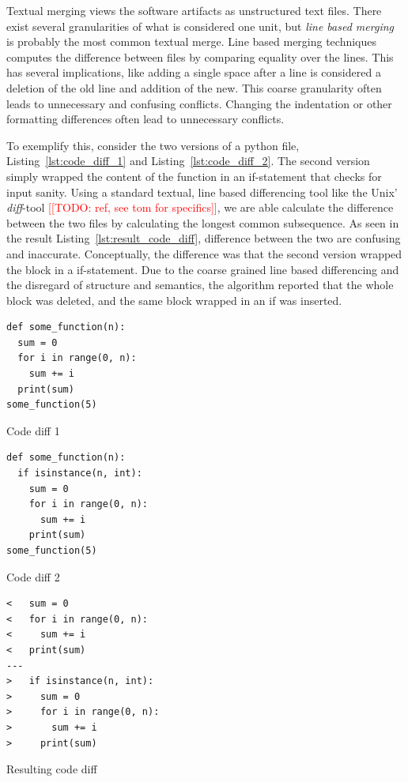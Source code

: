 \documentclass[a4paper,english]{ifimaster}
\newcommand{\todo}[1]{\textcolor{red}{[[TODO: #1]]}\PackageWarning{TODO:}{#1!}}
\begin{document}
Textual merging views the software artifacts as unstructured text files. There exist several granularities of what is considered one unit, but \textit{line based merging} is probably the most common textual merge. Line based merging techniques computes the difference between files by comparing equality over the lines. This has several implications, like adding a single space after a line is considered a deletion of the old line and addition of the new. This coarse granularity often leads to unnecessary and confusing conflicts. Changing the indentation or other formatting differences often lead to unnecessary conflicts.

To exemplify this, consider the two versions of a python file, Listing~\ref{lst:code_diff_1} and Listing~\ref{lst:code_diff_2}. The second version simply wrapped the content of the function in an if-statement that checks for input sanity. Using a standard textual, line based differencing tool like the Unix' \textit{diff}-tool \todo{ref, see tom for specifics}, we are able calculate the difference between the two files by calculating the longest common subsequence. As seen in the result Listing~\ref{lst:result_code_diff}, difference between the two are confusing and inaccurate. Conceptually, the difference was that the second version wrapped the block in a if-statement. Due to the coarse grained line based differencing and the disregard of structure and semantics, the algorithm reported that the whole block was deleted, and the same block wrapped in an if was inserted.

\begin{listing}
	\begin{verbatim}
def some_function(n):
  sum = 0
  for i in range(0, n):
    sum += i
  print(sum)
some_function(5)

  \end{verbatim}
	\caption{Code diff 1}
	\label{lst:code_diff_1}
\end{listing}

\begin{listing}
	\begin{verbatim}
def some_function(n):
  if isinstance(n, int):
    sum = 0
    for i in range(0, n):
      sum += i
    print(sum)
some_function(5)
  \end{verbatim}
	\caption{Code diff 2}
	\label{lst:code_diff_2}
\end{listing}

\begin{listing}
	\begin{verbatim}
<   sum = 0
<   for i in range(0, n):
<     sum += i
<   print(sum)
---
>   if isinstance(n, int):
>     sum = 0
>     for i in range(0, n):
>       sum += i
>     print(sum)
  \end{verbatim}
	\caption{Resulting code diff}
	\label{lst:result_code_diff}
\end{listing}
\end{document}
